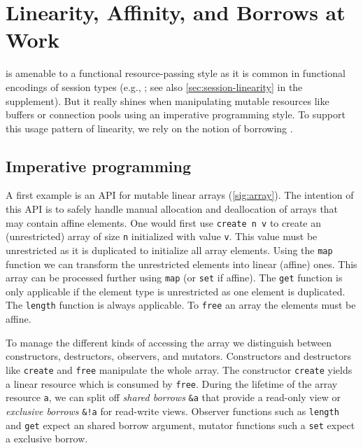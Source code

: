 \section{Linearity, Affinity, and Borrows at Work}
\label{motivation}

\lang{} is amenable to a functional resource-passing style as it is
common in functional encodings of session types (e.g.,
\cite{DBLP:journals/jfp/Padovani17}; see also
\cref{sec:session-linearity} in the supplement). But it really shines 
when manipulating mutable resources like buffers or connection pools
using an imperative programming style. 
%
To support this usage pattern of linearity, we rely on
the notion of borrowing \cite{DBLP:conf/popl/BoylandR05}.

\subsection{Imperative programming}
\label{sec:imper-progr}

A first example is an API for mutable linear arrays
(\cref{sig:array}).
The intention of this API is to safely handle manual allocation and
deallocation of arrays that may contain affine elements.
One would first use \lstinline/create n v/ to create
an (unrestricted) array of size \lstinline/n/ initialized with value
\lstinline/v/. This value must be unrestricted as it is duplicated to
initialize all array elements. Using the \lstinline/map/ function we
can transform the unrestricted elements into linear (affine)
ones. This array can be processed further using \lstinline/map/ (or \lstinline/set/ if
affine). The \lstinline/get/ function is only applicable if the element type
is unrestricted as one element is duplicated. The \lstinline/length/
function is always applicable. To \lstinline/free/ an array the elements must be
affine.

To manage the different kinds of accessing the array we distinguish between constructors, destructors,
observers, and mutators.
Constructors and destructors like \lstinline/create/ and \lstinline/free/ manipulate the whole
array. %
The constructor
\lstinline/create/ yields a linear resource which is consumed by \lstinline/free/.
During the lifetime of the array resource \lstinline/a/, we can split
off \emph{shared borrows} \lstinline/&a/ that provide a read-only
view or \emph{exclusive borrows} \lstinline/&!a/ for read-write views.
Observer functions such as \lstinline/length/ and \lstinline/get/ expect an shared borrow
argument, mutator functions such a \lstinline/set/ expect
a exclusive borrow.

